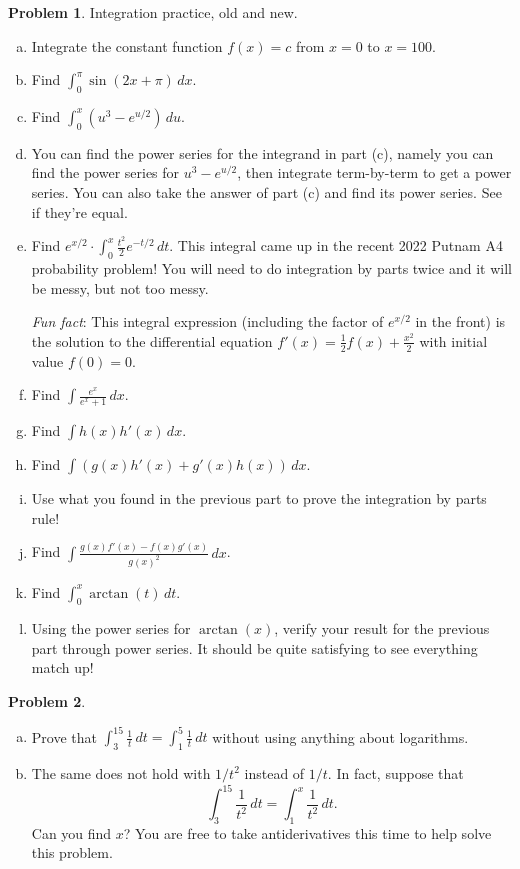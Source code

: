 \documentclass[11pt,oneside]{amsart}
\theoremstyle{definition}
\newtheorem{problem}{Problem}
\newcommand{\bR}{\mathbb{R}}
\begin{document}
\begin{problem}
Integration practice, old and new.
\begin{enumerate}[(a)]
  \item Integrate the constant function $f(x)=c$ from $x=0$ to $x=100$.
  \item Find $\int_0^\pi\sin(2x+\pi)\,dx$.
  \item Find $\int_0^x (u^3-e^{u/2})\,du$.
  \item You can find the power series for the integrand in part (c), namely you can find the power series for $u^3-e^{u/2}$, then integrate term-by-term to get a power series. You can also take the answer of part (c) and find its power series. See if they're equal.
  \item Find $e^{x/2}\cdot\int_0^x \frac{t^2}2 e^{-t/2}\,dt$. This integral came up in the recent 2022 Putnam A4 probability problem! You will need to do integration by parts twice and it will be messy, but not too messy.

        \emph{Fun fact}: This integral expression (including the factor of $e^{x/2}$ in the front) is the solution to the differential equation $f'(x)=\frac 12f(x)+\frac{x^2}2$ with initial value $f(0)=0$.
  \item Find $\int \frac{e^x}{e^x+1}\,dx$.
  \item Find $\int h(x)h'(x)\,dx$.
  \item Find $\int (g(x)h'(x)+g'(x)h(x))\,dx$.
  \item Use what you found in the previous part to prove the integration by parts rule!
  \item Find $\int \frac{g(x)f'(x)-f(x)g'(x)}{g(x)^2}\,dx$.
  \item Find $\int_0^x \arctan(t)\,dt$.
  \item Using the power series for $\arctan(x)$, verify your result for the previous part through power series. It should be quite satisfying to see everything match up!
\end{enumerate}
\end{problem}


\begin{problem}
\leavevmode \begin{enumerate}[(a)]
  \item Prove that $\int_{3}^{15}\frac 1t\,dt=\int_1^5\frac 1t\,dt$ without using anything about logarithms.
  \item The same does not hold with $1/t^2$ instead of $1/t$. In fact, suppose that
        \[\int_3^{15}\frac 1{t^2}\,dt=\int_1^x\frac 1{t^2}\,dt.\]
        Can you find $x$? You are free to take antiderivatives this time to help solve this problem.
\end{enumerate}
\end{problem}
\end{document}
